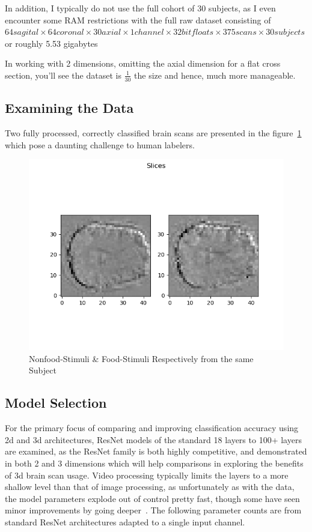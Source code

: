 In addition, I typically do not use the full cohort of 30 subjects, as I even encounter some RAM restrictions with the
full raw dataset consisting of
$64 sagital \times 64 coronal \times 30 axial \times 1 channel \times 32bit floats \times 375 scans \times 30 subjects$ or roughly 5.53 gigabytes

In working with 2 dimensions, omitting the axial dimension for a flat cross section, you'll see the dataset is
$\frac{1}{30}$ the size and hence, much more manageable.


\subsection{Examining the Data}\label{subsec:examining-data}

Two fully processed, correctly classified brain scans are presented in the figure~\ref{fig:comparison}
which pose a daunting challenge to human labelers.


\begin{figure}
  \includegraphics[width=\linewidth]{images/nf_f_hard_comparison.png}
  \caption{Nonfood-Stimuli \& Food-Stimuli Respectively from the same Subject}
  \label{fig:comparison}
\end{figure}

\subsection{Model Selection}\label{subsec:model-selection}

For the primary focus of comparing and improving classification accuracy using 2d and 3d architectures, ResNet models
of the standard 18 layers to 100+ layers are examined, as the ResNet family is both highly competitive, and demonstrated
in both 2 and 3 dimensions which will help comparisons in exploring the benefits of 3d brain scan usage.
Video processing typically limits the layers to a more shallow level than that of image processing, as unfortunately as
with the data, the model parameters explode out of control pretty fast, though some have seen minor improvements by
going deeper~\cite{hara3dcnns}.
The following parameter counts are from standard ResNet architectures adapted to a single input channel.

